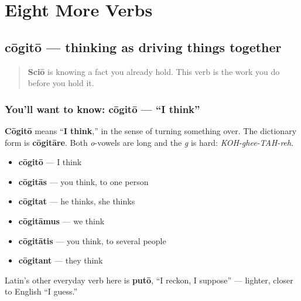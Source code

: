 
\chapter{Eight More Verbs}
\label{ch:la-more-core-verbs}

\section[cōgitō, cōgitāre]{cōgitō — thinking as driving things together}

\label{lesson:LA-C38-cogito}



\begin{quote}
\textbf{Sciō} is knowing a fact you already hold. This verb is the work you do before you hold it.
\end{quote}

\subsection*{You'll want to know: cōgitō — \textquotedblleft{}I think\textquotedblright{}}
\textbf{Cōgitō} means \textquotedblleft{}\textbf{I think},\textquotedblright{} in the sense of turning something over. The dictionary form is \textbf{cōgitāre}. Both \emph{o}-vowels are long and the \emph{g} is hard: \emph{KOH-ghee-TAH-reh}.

\begin{itemize}
\raggedright
  \item \textbf{cōgitō} — I think
  \item \textbf{cōgitās} — you think, to one person
  \item \textbf{cōgitat} — he thinks, she thinks
  \item \textbf{cōgitāmus} — we think
  \item \textbf{cōgitātis} — you think, to several people
  \item \textbf{cōgitant} — they think
\end{itemize}

Latin's other everyday verb here is \textbf{putō}, \textquotedblleft{}I reckon, I suppose\textquotedblright{} — lighter, closer to English \textquotedblleft{}I guess.\textquotedblright{}

